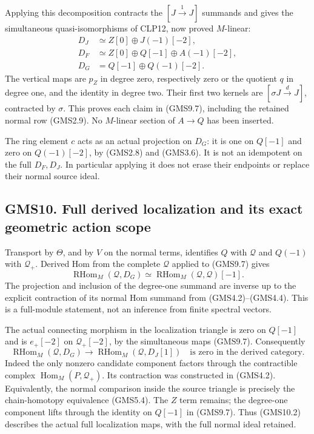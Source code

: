 Applying this decomposition contracts the \([J\xrightarrow1J]\) summands
and gives the simultaneous quasi-isomorphisms of CLP12, now proved
\(M\)-linear: \[
\begin{aligned}
D_J&\simeq Z[0]\oplus J(-1)[-2],\\
D_F&\simeq Z[0]\oplus Q[-1]\oplus A(-1)[-2],\\
D_G&=Q[-1]\oplus Q(-1)[-2].
\end{aligned}
\tag{GMS9.7}
\] The vertical maps are \(p_Z\) in degree zero, respectively zero or
the quotient \(q\) in degree one, and the identity in degree two. Their
first two kernels are \([\sigma J\xrightarrow dJ]\), contracted by
\(\sigma\). This proves each claim in (GMS9.7), including the retained
normal row (GMS2.9). No \(M\)-linear section of \(A\to Q\) has been
inserted.

The ring element \(c\) acts as an actual projection on \(D_G\): it is
one on \(Q[-1]\) and zero on \(Q(-1)[-2]\), by (GMS2.8) and (GMS3.6). It
is not an idempotent on the full \(D_F,D_J\). In particular applying it
does not erase their endpoints or replace their normal source ideal.

\subsection{GMS10. Full derived localization and its exact geometric
action
scope}\label{gms10.-full-derived-localization-and-its-exact-geometric-action-scope}

Transport by \(\Theta\), and by \(V\) on the normal terms, identifies
\(Q\) with \(\mathcal Q\) and \(Q(-1)\) with \(\mathcal Q_+\). Derived
Hom from the complete \(\mathcal Q\) applied to (GMS9.7) gives \[
\operatorname{RHom}_M(\mathcal Q,D_G)
\simeq\operatorname{RHom}_M(\mathcal Q,\mathcal Q)[-1].
\tag{GMS10.1}
\] The projection and inclusion of the degree-one summand are inverse up
to the explicit contraction of its normal Hom summand from
(GMS4.2)--(GMS4.4). This is a full-module statement, not an inference
from finite spectral vectors.

The actual connecting morphism in the localization triangle is zero on
\(Q[-1]\) and is \(e_+[-2]\) on \(\mathcal Q_+[-2]\), by the
simultaneous maps (GMS9.7). Consequently \[
\operatorname{RHom}_M(\mathcal Q,D_G)
\longrightarrow\operatorname{RHom}_M(\mathcal Q,D_J[1])
\quad\text{is zero in the derived category}.
\tag{GMS10.2}
\] Indeed the only nonzero candidate component factors through the
contractible complex \(\operatorname{Hom}_M(P,\mathcal Q_+)\). Its
contraction was constructed in (GMS4.2). Equivalently, the normal
comparison inside the source triangle is precisely the chain-homotopy
equivalence (GMS5.4). The \(Z\) term remains; the degree-one component
lifts through the identity on \(Q[-1]\) in (GMS9.7). Thus (GMS10.2)
describes the actual full localization maps, with the full normal ideal
retained.

